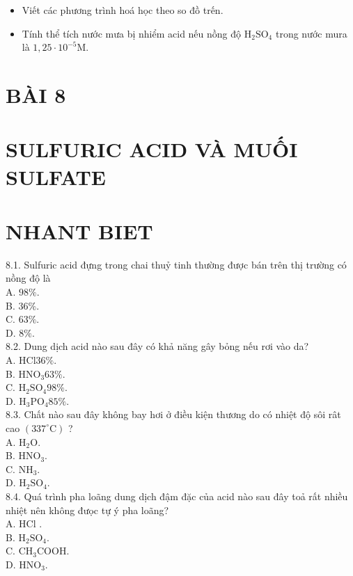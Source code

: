 \documentclass[10pt]{article}
\begin{document}
\begin{itemize}
  \item Viết các phương trình hoá học theo so đồ trến.
  \item Tính thể tích nước mưa bị nhiểm acid nếu nồng độ $\mathrm{H}_{2} \mathrm{SO}_{4}$ trong nước mura là $1,25 \cdot 10^{-5} \mathrm{M}$.
\end{itemize}

\section*{BÀI 8}
\section*{SULFURIC ACID VÀ MUỐI SULFATE}
\section*{NHANT BIET}
8.1. Sulfuric acid đựng trong chai thuỷ tinh thường được bán trên thị trường có nồng độ là\\
A. $98 \%$.\\
B. $36 \%$.\\
C. $63 \%$.\\
D. $8 \%$.\\
8.2. Dung dịch acid nào sau đây có khả năng gây bỏng nếu rơi vào da?\\
A. $\mathrm{HCl} 36 \%$.\\
B. $\mathrm{HNO}_{3} 63 \%$.\\
C. $\mathrm{H}_{2} \mathrm{SO}_{4} 98 \%$.\\
D. $\mathrm{H}_{3} \mathrm{PO}_{4} 85 \%$.\\
8.3. Chất nào sau đây không bay hơi ở điều kiện thương do có nhiệt độ sôi rât cao $\left(337^{\circ} \mathrm{C}\right)$ ?\\
A. $\mathrm{H}_{2} \mathrm{O}$.\\
B. $\mathrm{HNO}_{3}$.\\
C. $\mathrm{NH}_{3}$.\\
D. $\mathrm{H}_{2} \mathrm{SO}_{4}$.\\
8.4. Quá trình pha loãng dung dịch đậm đặc của acid nào sau đây toả rất nhiều nhiệt nên không đưọc tự ý pha loãng?\\
A. HCl .\\
B. $\mathrm{H}_{2} \mathrm{SO}_{4}$.\\
C. $\mathrm{CH}_{3} \mathrm{COOH}$.\\
D. $\mathrm{HNO}_{3}$.\\
\end{document}
